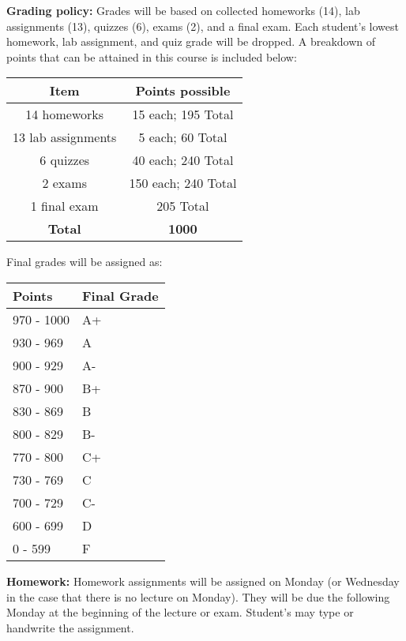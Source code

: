 \documentclass{article}
\begin{document}
\noindent\textbf{Grading policy:} 
Grades will be based on collected homeworks (14), lab assignments (13), quizzes (6), exams (2), and a final exam. Each student's lowest homework, lab assignment, and quiz grade will be dropped. A breakdown of points that can be attained in this course is included below:

\begin{center}
	\begin{tabular}{cc}
		\textbf{Item} & \textbf{Points possible} \\
		\hline
		14 homeworks & 15 each; 195 Total\\
		13 lab assignments & 5 each; 60 Total \\
		6 quizzes & 40 each; 240 Total \\
		2 exams & 150 each; 240 Total \\
		1 final exam & 205 Total \\
		\hline
		\textbf{Total} & \textbf{1000}\\
	\end{tabular}
\end{center}

Final grades will be assigned as:
\begin{center}
	\begin{tabular}{p{2cm}p{2.5cm}}
		\textbf{Points} & \textbf{Final Grade} \\ \hline
		970 - 1000 & A+ \\
		930 - 969 & A \\
		900 - 929 & A- \\
		870 - 900 & B+ \\
		830 - 869 & B \\
		800 - 829 & B- \\
		770 - 800 & C+ \\
		730 - 769 & C \\
		700 - 729 & C- \\
		600 - 699 & D \\
		0 - 599 & F \\ \hline
	\end{tabular}
\end{center}

\noindent\textbf{Homework:} Homework assignments will be assigned on Monday (or Wednesday in the case that there is no lecture on Monday). They will be due the following Monday at the beginning of the lecture or exam. Student's may type or handwrite the assignment. \\
\end{document}
